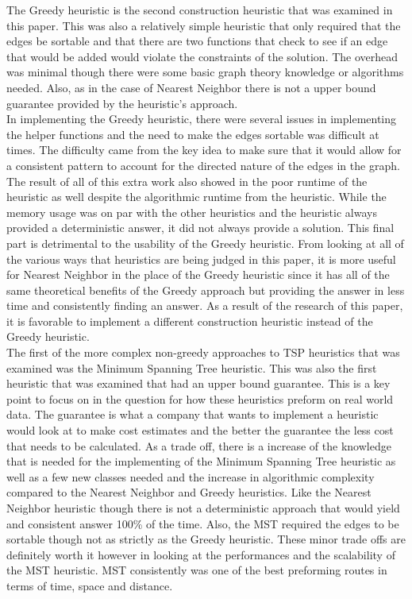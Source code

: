 \documentclass[midd]{thesis}
\newcommand{\tab}{\hspace*{2em}}
\begin{document}
\tab The Greedy heuristic is the second construction heuristic that was examined in this paper. This was also a relatively simple heuristic that only required that the edges be sortable and that there are two functions that check to see if an edge that would be added would violate the constraints of the solution. The overhead was minimal though there were some basic graph theory knowledge or algorithms needed. Also, as in the case of Nearest Neighbor there is not a upper bound guarantee provided by the heuristic's approach.\\
\tab In implementing the Greedy heuristic, there were several issues in implementing the helper functions and the need to make the edges sortable was difficult at times. The difficulty came from the key idea to make sure that it would allow for a consistent pattern to account for the directed nature of the edges in the graph. The result of all of this extra work also showed in the poor runtime of the heuristic as well despite the algorithmic runtime from the heuristic. While the memory usage was on par with the other heuristics and the heuristic always provided a deterministic answer, it did not always provide a solution. This final part is detrimental to the usability of the Greedy heuristic. From looking at all of the various ways that heuristics are being judged in this paper, it is more useful for Nearest Neighbor in the place of the Greedy heuristic since it has all of the same theoretical benefits of the Greedy approach but providing the answer in less time and consistently finding an answer. As a result of the research of this paper, it is favorable to implement a different construction heuristic instead of the Greedy heuristic.\\
\tab The first of the more complex non-greedy approaches to TSP heuristics that was examined was the Minimum Spanning Tree heuristic. This was also the first heuristic that was examined that had an upper bound guarantee. This is a key point to focus on in the question for how these heuristics preform on real world data. The guarantee is what a company that wants to implement a heuristic would look at to make cost estimates and the better the guarantee the less cost that needs to be calculated. As a trade off, there is a increase of the knowledge that is needed for the implementing of the Minimum Spanning Tree heuristic as well as a few new classes needed and the increase in algorithmic complexity compared to the Nearest Neighbor and Greedy heuristics. Like the Nearest Neighbor heuristic though there is not a deterministic approach that would yield and consistent answer 100\% of the time. Also, the MST required the edges to be sortable though not as strictly as the Greedy heuristic. These minor trade offs are definitely worth it however in looking at the performances and the scalability of the MST heuristic. MST consistently was one of the best preforming routes in terms of time, space and distance.\\
\end{document}
